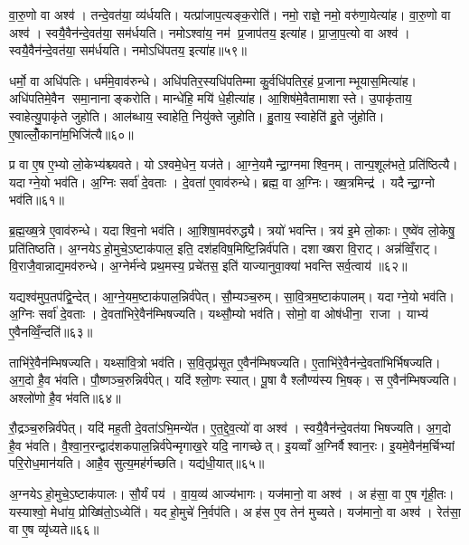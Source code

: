 वा॒रु॒णो वा अश्व॑। तन्दे॒वत॑या॒ व्य॑र्धयति। यत्प्रा॑जाप॒त्यङ्क॒रोति॑। नमो॒ राज्ञे॒ नमो॒ वरु॑णा॒येत्या॑ह। वा॒रु॒णो वा अश्व॑। स्वयै॒वैन॑न्दे॒वत॑या॒ सम॑र्धयति। नमोऽश्वा॑य॒ नम॑ प्र॒जाप॑तय॒ इत्या॑ह। प्रा॒जा॒प॒त्यो वा अश्व॑। स्वयै॒वैन॑न्दे॒वत॑या॒ सम॑र्धयति। नमोऽधि॑पतय॒ इत्या॑ह॥५९॥

धर्मो॒ वा अधि॑पतिः। धर्म॑मे॒वाव॑रुन्धे। अधि॑पतिर॒स्यधि॑पतिम्मा कु॒र्वधि॑पतिर॒हं प्र॒जानाम्भूयास॒मित्या॑ह। अधि॑पतिमे॒वैन समा॒नानाङ्करोति। मान्धे॑हि॒ मयि॑ धे॒हीत्या॑ह। आ॒शिष॑मे॒वैतामाशास्ते। उ॒पाकृ॑ताय॒ स्वाहेत्यु॒पाकृ॑ते जुहोति। आल॑ब्धाय॒ स्वाहेति॒ नियु॑क्ते जुहोति। हु॒ताय॒ स्वाहेति॑ हु॒ते जु॑होति। ए॒षाल्लोँ॒काना॑म॒भिजि॑त्यै॥६०॥

प्र वा ए॒ष ए॒भ्यो लो॒केभ्य॑श्च्यवते। योऽश्वमे॒धेन॒ यज॑ते। आ॒ग्ने॒यमैन्द्रा॒ग्नमाश्वि॒नम्। तान्प॒शूल॑भते॒ प्रति॑ष्ठित्यै। यदाग्ने॒यो भव॑ति। अ॒ग्निः सर्वा॑ दे॒वताः। दे॒वता॑ ए॒वाव॑रुन्धे। ब्रह्म॒ वा अ॒ग्निः। ख्ष॒त्रमिन्द्र॑। यदैन्द्रा॒ग्नो भव॑ति॥६१॥

ब्र॒ह्म॒ख्ष॒त्रे ए॒वाव॑रुन्धे। यदाश्वि॒नो भव॑ति। आ॒शिषा॒मव॑रुद्ध्यै। त्रयो॑ भवन्ति। त्रय॑ इ॒मे लो॒काः। ए॒ष्वे॑व लो॒केषु॒ प्रति॑तिष्ठति। अ॒ग्नयेऽहो॒मुचे॒ऽष्टाक॑पाल॒ इति॒ दश॑हविष॒मिष्टि॒न्निर्व॑पति। दशाख्षरा वि॒राट्। अन्न॑व्विँ॒राट्। वि॒राजै॒वान्नाद्य॒मव॑रुन्धे। अ॒ग्नेर्म॑न्वे प्रथ॒मस्य॒ प्रचे॑तस॒ इति॑ याज्यानुवा॒क्या॑ भवन्ति सर्व॒त्वाय॑ ॥६२॥\anuvakamend[अधि॑पतय॒ इत्या॑हा॒भि॑जित्या ऐन्द्रा॒ग्नो भव॑ति रुन्ध॒ एक॑ञ्च]

यद्यश्व॑मुप॒तप॑द्वि॒न्देत्। आ॒ग्ने॒यम॒ष्टाक॑पाल॒न्निर्व॑पेत्। सौ॒म्यञ्च॒रुम्। सा॒वि॒त्रम॒ष्टाक॑पालम्। यदाग्ने॒यो भव॑ति। अ॒ग्निः सर्वा॑ दे॒वताः। दे॒वता॑भिरे॒वैन॑म्भिषज्यति। यथ्सौ॒म्यो भव॑ति। सोमो॒ वा ओष॑धीना॒ राजा। याभ्य॑ ए॒वैनव्विँ॒न्दति॑॥६३॥

ताभि॑रे॒वैन॑म्भिषज्यति। यथ्सा॑वि॒त्रो भव॑ति। स॒वि॒तृप्र॑सूत ए॒वैन॑म्भिषज्यति। ए॒ताभि॑रे॒वैन॑न्दे॒वता॑भिर्भिषज्यति। अ॒ग॒दो है॒व भ॑वति। पौ॒ष्णञ्च॒रुन्निर्व॑पेत्। यदि॑ श्लो॒णः स्यात्। पू॒षा वै श्लौण्य॑स्य भि॒षक्। स ए॒वैन॑म्भिषज्यति। अश्लो॑णो है॒व भ॑वति॥६४॥

रौ॒द्रञ्च॒रुन्निर्व॑पेत्। यदि॑ मह॒ती दे॒वता॑ऽभि॒मन्ये॑त। ए॒त॒द्दे॒व॒त्यो॑ वा अश्व॑। स्वयै॒वैन॑न्दे॒वत॑या भिषज्यति। अ॒ग॒दो है॒व भ॑वति। वै॒श्वा॒न॒रन्द्वाद॑शकपाल॒न्निर्व॑पेन्मृगाख॒रे यदि॒ नागच्छेत्। इ॒यव्वाँ अ॒ग्निर्वैश्वान॒रः। इ॒यमे॒वैन॑म॒र्चिभ्यां परि॒रोध॒मान॑यति। आहै॒व सुत्य॒मह॑र्गच्छति। यद्य॑धी॒यात्॥६५॥

अ॒ग्नयेऽहो॒मुचे॒ऽष्टाक॑पालः। सौ॒र्यं पय॑। वा॒य॒व्य॑ आज्य॑भागः। यज॑मानो॒ वा अश्व॑। अह॑सा॒ वा ए॒ष गृ॑ही॒तः। यस्याश्वो॒ मेधा॑य॒ प्रोख्षि॑तो॒ऽध्येति॑। यदहो॒मुचे॑ नि॒र्वप॑ति। अह॑स ए॒व तेन॑ मुच्यते। यज॑मानो॒ वा अश्व॑। रेत॑सा॒ वा ए॒ष व्यृ॑ध्यते॥६६॥

